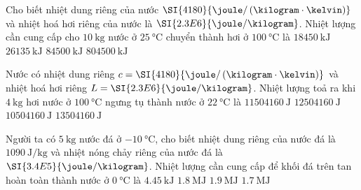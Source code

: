 \begin{ex}
Cho biết nhiệt dung riêng của nước $\SI{4180}{\joule/\left(\kilogram\cdot\kelvin\right)}$ và nhiệt hoá hơi riêng của nước là $\SI{2.3E6}{\joule/\kilogram}$. Nhiệt lượng cần cung cấp cho $\SI{10}{\kilogram}$ nước ở $\SI{25}{\celsius}$ chuyển thành hơi ở $\SI{100}{\celsius}$ là
	\choice
	{$\SI{18450}{\kilo\joule}$}
	{\True $\SI{26135}{\kilo\joule}$}
	{$\SI{84500}{\kilo\joule}$}
	{$\SI{804500}{\kilo\joule}$}
\end{ex}
\begin{ex}
	Nước có nhiệt dung riêng $c=\SI{4180}{\joule/\left(\kilogram\cdot\kelvin\right)}$ và nhiệt hoá hơi riêng $L=\SI{2.3E6}{\joule/\kilogram}$. Nhiệt lượng toả ra khi $\SI{4}{\kilogram}$ hơi nước ở $\SI{100}{\celsius}$ ngưng tụ thành nước ở $\SI{22}{\celsius}$ là 
	\choice
	{$\SI{11504160}{\joule}$}
	{$\SI{12504160}{\joule}$}
	{\True $\SI{10504160}{\joule}$}
	{$\SI{13504160}{\joule}$}
\end{ex}
\begin{ex}
	Người ta có $\SI{5}{\kilogram}$ nước đá ở $\SI{-10}{\celsius}$, cho biết nhiệt dung riêng của nước đá là $\SI{1090}{\joule/\kilogram}$ và nhiệt nóng chảy riêng của nước đá là $\SI{3.4E5}{\joule/\kilogram}$. Nhiệt lượng cần cung cấp để khối đá trên tan hoàn toàn thành nước ở $\SI{0}{\celsius}$ là
	\choice
	{$\SI{4.45}{\kilo\joule}$}
	{\True $\SI{1.8}{\mega\joule}$}
	{$\SI{1.9}{\mega\joule}$}
	{$\SI{1.7}{\mega\joule}$}
\end{ex}

